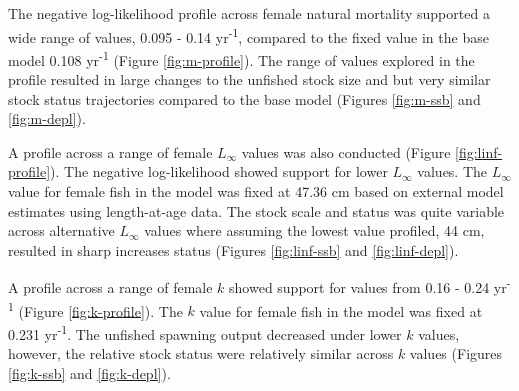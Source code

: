 \documentclass[11pt,
  english,
  a4paper,
]{article}
\begin{document}
\leavevmode\tagmcend\tagstructend\par


The negative log-likelihood profile across female natural mortality supported a wide range of values, 0.095 - 0.14 yr\textsuperscript{-1}, compared to the fixed value in the base model 0.108 yr\textsuperscript{-1} (Figure \ref{fig:m-profile}). The range of values explored in the profile resulted in large changes to the unfished stock size and but very similar stock status trajectories compared to the base model (Figures \ref{fig:m-ssb} and \ref{fig:m-depl}).

\leavevmode\tagmcend\tagstructend\par


A profile across a range of female {\(L_{\infty}\)\leavevmode\tagmcend\tagstructend} values was also conducted (Figure \ref{fig:linf-profile}). The negative log-likelihood showed support for lower {\(L_{\infty}\)\leavevmode\tagmcend\tagstructend} values. The {\(L_{\infty}\)\leavevmode\tagmcend\tagstructend} value for female fish in the model was fixed at 47.36 cm based on external model estimates using length-at-age data. The stock scale and status was quite variable across alternative {\(L_{\infty}\)\leavevmode\tagmcend\tagstructend} values where assuming the lowest value profiled, 44 cm, resulted in sharp increases status (Figures \ref{fig:linf-ssb} and \ref{fig:linf-depl}).

\leavevmode\tagmcend\tagstructend\par


A profile across a range of female {\(k\)\leavevmode\tagmcend\tagstructend} showed support for values from 0.16 - 0.24 yr\textsuperscript{-1} (Figure \ref{fig:k-profile}). The {\(k\)\leavevmode\tagmcend\tagstructend} value for female fish in the model was fixed at 0.231 yr\textsuperscript{-1}. The unfished spawning output decreased under lower {\(k\)\leavevmode\tagmcend\tagstructend} values, however, the relative stock status were relatively similar across {\(k\)\leavevmode\tagmcend\tagstructend} values (Figures \ref{fig:k-ssb} and \ref{fig:k-depl}).
\end{document}
